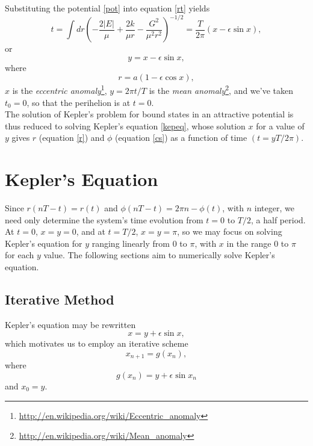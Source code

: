 \documentclass[10pt]{article}
\begin{document}
\noindent Substituting the potential \ref{pot} into equation \ref{rt} yields
\begin{equation*}
t = \int dr \left(-\frac{2 \left|E\right|}{\mu}+\frac{2k}{\mu r}-\frac{G^2}{\mu^2 r^2}\right)^{-1/2} = \frac{T}{2 \pi} \left(x-\epsilon \sin x\right),
\end{equation*}
\noindent or
\begin{equation}\label{kepeq}
y = x-\epsilon \sin x,
\end{equation}
\noindent where
\begin{equation}\label{r}
r = a \left(1-\epsilon \cos x\right),
\end{equation}
\noindent $x$ is the \emph{eccentric anomaly}\footnote{\url{http://en.wikipedia.org/wiki/Eccentric_anomaly}}, $y = 2 \pi t / T$ is the \emph{mean anomaly}\footnote{\url{http://en.wikipedia.org/wiki/Mean_anomaly}}, and we've taken $t_0 = 0$, so that the perihelion is at $t=0$. \\

\noindent The solution of Kepler's problem for  bound states in an attractive potential is thus reduced to solving Kepler's equation \ref{kepeq}, whose solution $x$ for a value of $y$ gives $r$ (equation \ref{r}) and $\phi$ (equation \ref{cs}) as a function of time $\left(t=yT/2\pi\right)$.

\section{Kepler's Equation}
\noindent Since $r\left(nT-t\right)=r\left(t\right)$ and $\phi\left(nT-t\right) = 2 \pi n - \phi\left(t\right)$, with $n$ integer, we need only determine the system's time evolution from $t = 0$ to $T/2$, a half period. At $t=0$, $x=y=0$, and at $t=T/2$, $x=y=\pi$, so we may focus on solving Kepler's equation for $y$ ranging linearly from $0$ to $\pi$, with $x$ in the range $0$ to $\pi$ for each $y$ value. The following sections aim to numerically solve Kepler's equation.

\subsection{Iterative Method}

\noindent Kepler's equation may be rewritten
\begin{equation*}
x = y + \epsilon \sin x,
\end{equation*}
\noindent which motivates us to employ an iterative scheme
\begin{equation}\label{iteration}
x_{n+1} = g\left(x_n\right),
\end{equation}
\noindent where
\begin{equation}\label{kepg}
g\left(x_n\right) = y + \epsilon \sin x_n
\end{equation}
\noindent and $x_0 = y$. \\
\end{document}
